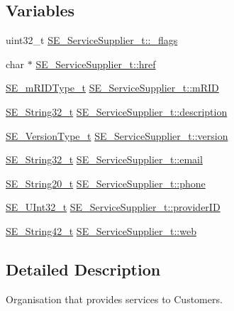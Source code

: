 \subsection*{Variables}
\begin{DoxyCompactItemize}
\item 
uint32\+\_\+t \hyperlink{group__ServiceSupplier_ga41efbca82458bf466f86bba6e0781fee}{S\+E\+\_\+\+Service\+Supplier\+\_\+t\+::\+\_\+flags}
\item 
char $\ast$ \hyperlink{group__ServiceSupplier_gad5b711de34ee477aaa2daddc4577bfeb}{S\+E\+\_\+\+Service\+Supplier\+\_\+t\+::href}
\item 
\hyperlink{group__mRIDType_gac74622112f3a388a2851b2289963ba5e}{S\+E\+\_\+m\+R\+I\+D\+Type\+\_\+t} \hyperlink{group__ServiceSupplier_ga1b4fcb150a9e4ac2bf15c73fb0195c14}{S\+E\+\_\+\+Service\+Supplier\+\_\+t\+::m\+R\+ID}
\item 
\hyperlink{group__String32_gac9f59b06b168b4d2e0d45ed41699af42}{S\+E\+\_\+\+String32\+\_\+t} \hyperlink{group__ServiceSupplier_ga8f0635af29f2fcd2e10874b7fa194bb3}{S\+E\+\_\+\+Service\+Supplier\+\_\+t\+::description}
\item 
\hyperlink{group__VersionType_ga4b8d27838226948397ed99f67d46e2ae}{S\+E\+\_\+\+Version\+Type\+\_\+t} \hyperlink{group__ServiceSupplier_gaf772e85b2c6f57fa9adba209a9b6b998}{S\+E\+\_\+\+Service\+Supplier\+\_\+t\+::version}
\item 
\hyperlink{group__String32_gac9f59b06b168b4d2e0d45ed41699af42}{S\+E\+\_\+\+String32\+\_\+t} \hyperlink{group__ServiceSupplier_gaba52040aa146ecd82d50a3deb2d98c19}{S\+E\+\_\+\+Service\+Supplier\+\_\+t\+::email}
\item 
\hyperlink{group__String20_gac62354528eb48096f8deab6e503a3193}{S\+E\+\_\+\+String20\+\_\+t} \hyperlink{group__ServiceSupplier_ga182c6fbb5b90206fad482369e835961c}{S\+E\+\_\+\+Service\+Supplier\+\_\+t\+::phone}
\item 
\hyperlink{group__UInt32_ga70bd4ecda3c0c85d20779d685a270cdb}{S\+E\+\_\+\+U\+Int32\+\_\+t} \hyperlink{group__ServiceSupplier_ga0fbfa3eb24a6d2d0a652f44524327618}{S\+E\+\_\+\+Service\+Supplier\+\_\+t\+::provider\+ID}
\item 
\hyperlink{group__String42_gad5a294b994fa3a024ca6d747f784f0d9}{S\+E\+\_\+\+String42\+\_\+t} \hyperlink{group__ServiceSupplier_gae334c85b63bc5c156ed70d2d7359b0f0}{S\+E\+\_\+\+Service\+Supplier\+\_\+t\+::web}
\end{DoxyCompactItemize}


\subsection{Detailed Description}
Organisation that provides services to Customers. 

